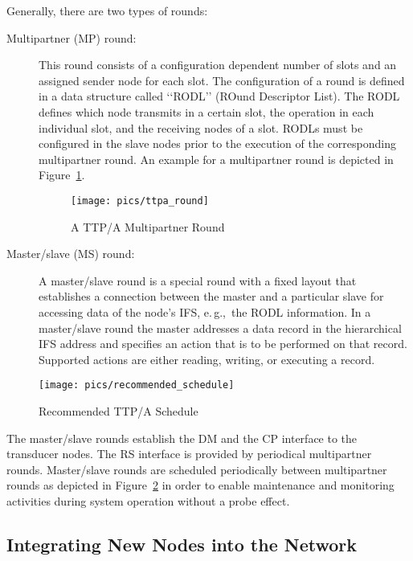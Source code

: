 \documentclass[11pt,a4paper,]{article}
\def\eg{e.\,g.,~}
\def\lqq{\lq\lq}
\def\rqq{\rq\rq}
\def\dq#1{\lqq #1\rqq}
\begin{document}
Generally, there are two types of rounds:

\begin{description}

\item[Multipartner (MP) round:] This round consists of a configuration
dependent number of slots and an assigned sender node for each
slot. The configuration of a round is defined in a data structure
called \dq{RODL} (ROund Descriptor List). The RODL defines which
node transmits in a certain slot, the operation in each individual
slot, and the receiving nodes of a slot. RODLs must be configured
in the slave nodes prior to the execution of the corresponding
multipartner round. An example for a multipartner round is
depicted in Figure~\ref{fig:ttpa_round}.

\begin{figure}[t]
  \centerline{\texttt{[image: pics/ttpa\_round]}}
    \caption{A TTP/A Multipartner Round}
    \label{fig:ttpa_round}
\end{figure}

\item[Master/slave (MS) round:] A master/slave round is a special round
with a fixed layout that establishes a connection between the master
and a particular slave for accessing data of the node's \ac{IFS},
\eg the RODL information. In a master/slave round the master
addresses a data record in the hierarchical \ac{IFS} address and
specifies an action that is to be performed on that record.
Supported actions are either reading, writing, or executing a
record.

\end{description}


\begin{figure}[b]
  \centerline{\texttt{[image: pics/recommended\_schedule]}}
    \caption{Recommended TTP/A Schedule}
    \label{fig:recommended_schedule}
\end{figure}

The master/slave rounds establish the DM and the CP interface to
the transducer nodes. The RS interface is provided by periodical
multipartner rounds. Master/slave rounds are scheduled
periodically between multipartner rounds as depicted in
Figure~\ref{fig:recommended_schedule} in order to enable
maintenance and monitoring activities during system operation
without a probe effect.

\subsection{Integrating New Nodes into the Network}
\end{document}
